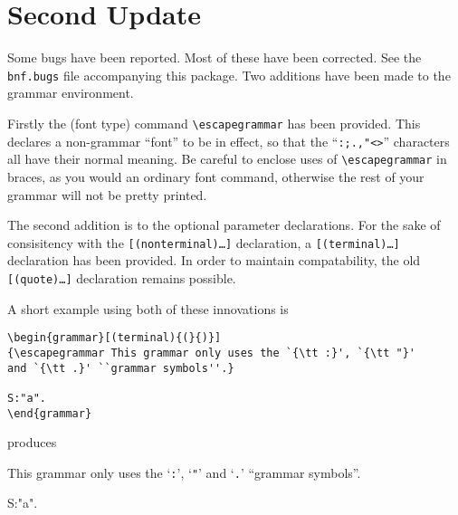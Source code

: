 \section{Second Update}
Some bugs have been reported. Most of these have been corrected. See the
{\tt bnf.bugs} file accompanying this package. Two additions have been
made to the grammar environment.

Firstly the (font type) command
\verb!\escapegrammar! has been provided. This declares a non-grammar
``font'' to be in effect, so that the ``\verb!:;.,"<>!'' characters all
have their normal meaning. Be careful to enclose uses of
\verb!\escapegrammar! in braces, as you would an ordinary font command,
otherwise the rest of your grammar will not be pretty printed.

The second addition is to the optional parameter declarations. For the
sake of consisitency with the {\tt [(nonterminal)\ldots]} declaration, a
{\tt [(terminal)\ldots]} declaration has been provided. In order to maintain 
compatability, the old {\tt [(quote)\ldots]} declaration remains
possible.

A short example using both of these innovations is
\begin{verbatim}
\begin{grammar}[(terminal){(}{)}]
{\escapegrammar This grammar only uses the `{\tt :}', `{\tt "}'
and `{\tt .}' ``grammar symbols''.}

S:"a".
\end{grammar}
\end{verbatim}
produces
\begin{grammar}[(terminal){(}{)}]
{\escapegrammar This grammar only uses the `{\tt :}', `{\tt "}'
and `{\tt .}' ``grammar symbols''.}

S:"a".
\end{grammar}

